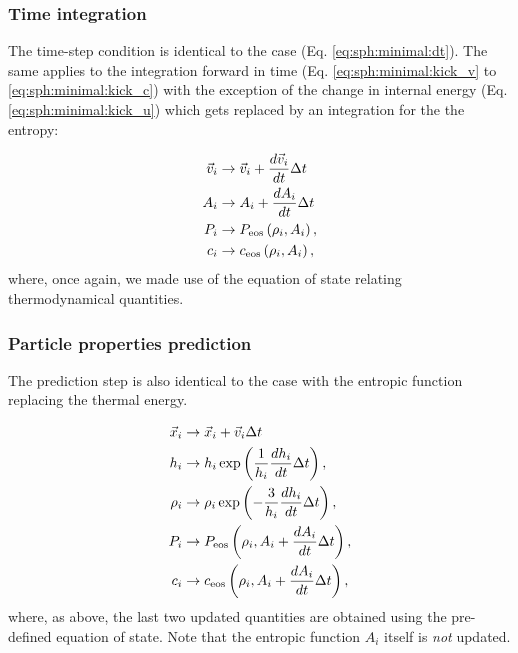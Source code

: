 \subsubsection{Time integration}

The time-step condition is identical to the \MinimalSPH case
(Eq. \ref{eq:sph:minimal:dt}). The same applies to the integration
forward in time (Eq. \ref{eq:sph:minimal:kick_v} to
\ref{eq:sph:minimal:kick_c}) with the exception of the change in
internal energy (Eq. \ref{eq:sph:minimal:kick_u}) which gets replaced
by an integration for the the entropy:


\begin{align}
  \vec{v}_i &\rightarrow \vec{v}_i + \frac{d\vec{v}_i}{dt} \Delta t 
\label{eq:sph:gadget2:kick_v}\\
  A_i &\rightarrow A_i + \frac{dA_i}{dt} \Delta t
\label{eq:sph:gadget2:kick_A}\\
  P_i &\rightarrow P_{\rm eos}\left(\rho_i, A_i\right)
\label{eq:sph:gadget2:kick_P}, \\
  c_i &\rightarrow c_{\rm eos}\left(\rho_i, A_i\right)
\label{eq:sph:gadget2:kick_c},
\end{align}
where, once again, we made use of the equation of state relating
thermodynamical quantities.

\subsubsection{Particle properties prediction}

The prediction step is also identical to the \MinimalSPH case with the
entropic function replacing the thermal energy.

\begin{align}
  \vec{x}_i &\rightarrow \vec{x}_i + \vec{v}_i \Delta t 
\label{eq:sph:gadget2:drift_x} \\
  h_i &\rightarrow h_i \exp\left(\frac{1}{h_i} \frac{dh_i}{dt}
  \Delta t\right), \label{eq:sph:gadget2:drift_h}\\
  \rho_i &\rightarrow \rho_i \exp\left(-\frac{3}{h_i} \frac{dh_i}{dt}
  \Delta t\right), \label{eq:sph:gadget2:drift_rho} \\
  P_i &\rightarrow P_{\rm eos}\left(\rho_i, A_i + \frac{dA_i}{dt} \Delta
t\right), \label{eq:sph:gadget2:drift_P}\\
  c_i &\rightarrow c_{\rm eos}\left(\rho_i, A_i + \frac{dA_i}{dt}
  \Delta t\right) \label{eq:sph:gadget2:drift_c},
\end{align}
where, as above, the last two updated quantities are obtained using
the pre-defined equation of state. Note that the entropic function $A_i$
itself is \emph{not} updated.

